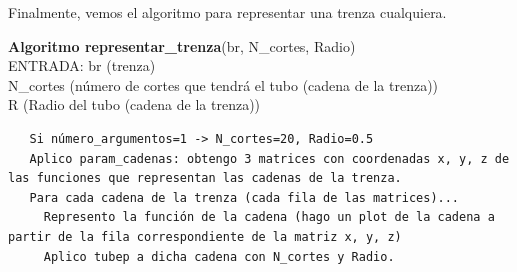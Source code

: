  Finalmente, vemos el algoritmo para representar una trenza cualquiera. 
\begin{alg}
  	\textbf{Algoritmo representar\_trenza}(br, N\_cortes, Radio)\\
  	ENTRADA: br (trenza)\\
  	\hspace*{2.2cm} N\_cortes (número de cortes que tendrá el tubo (cadena de la trenza))\\
  	\hspace*{2.2cm} R (Radio del tubo (cadena de la trenza))
  	
\begin{lstlisting}
   Si número_argumentos=1 -> N_cortes=20, Radio=0.5
   Aplico param_cadenas: obtengo 3 matrices con coordenadas x, y, z de las funciones que representan las cadenas de la trenza.
   Para cada cadena de la trenza (cada fila de las matrices)...
     Represento la función de la cadena (hago un plot de la cadena a partir de la fila correspondiente de la matriz x, y, z)
     Aplico tubep a dicha cadena con N_cortes y Radio.
\end{lstlisting}
\end{alg}

